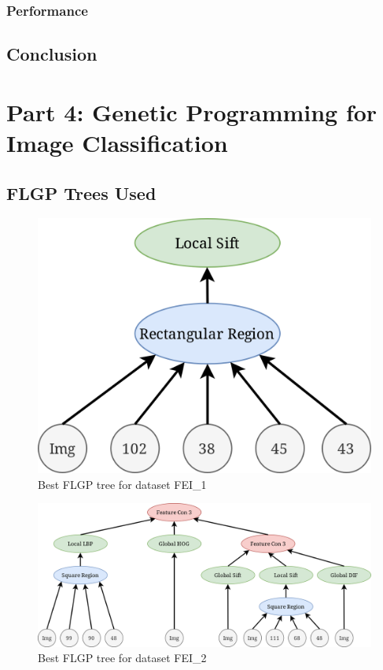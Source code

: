 \documentclass{article}
\begin{document}
\subsubsection*{Performance}
	
\subsection*{Conclusion}

\section*{Part 4: Genetic Programming for Image Classification}
\subsection*{FLGP Trees Used}
\begin{figure}[h!]
	\centering
	\includegraphics[width=\linewidth]{flgp_F1.png}
	\caption{Best FLGP tree for dataset FEI\_1}
\end{figure}
\begin{figure}[h!]
	\centering
	\includegraphics[width=\linewidth]{flgp_F2.png}
	\caption{Best FLGP tree for dataset FEI\_2}
\end{figure}
\end{document}

